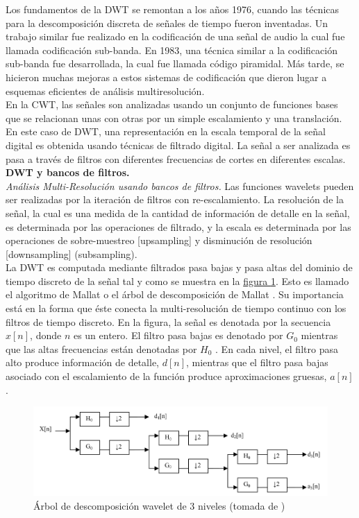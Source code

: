 \documentclass[11pt,lettersize]{article} %
\newcommand{\figura}[1]{\hyperref[{#1}]{figura \ref*{#1}}}
\begin{document}
Los fundamentos de la DWT se remontan a los años 1976, cuando las técnicas para la descomposición discreta de señales de tiempo fueron inventadas. Un trabajo similar fue realizado en la codificación de una señal de audio la cual fue llamada codificación sub-banda. En 1983, una técnica similar a la codificación sub-banda fue desarrollada, la cual fue llamada código piramidal. Más tarde, se hicieron muchas mejoras a estos sistemas de codificación que dieron lugar a esquemas eficientes de análisis multiresolución.\\

En la CWT, las señales son analizadas usando un conjunto de funciones bases que se relacionan unas con otras por un simple escalamiento y una translación. En este caso de DWT, una representación en la escala temporal de la señal digital es obtenida usando técnicas de filtrado digital. La señal a ser analizada es pasa a través de filtros con diferentes frecuencias de cortes en diferentes escalas.\\

\textbf{DWT y bancos de filtros.}\\
\textit{Análisis Multi-Resolución usando bancos de filtros.}
Las funciones wavelets pueden ser realizadas por la iteración de filtros con re-escalamiento. La resolución de la señal, la cual es una medida de la cantidad de información de detalle en la señal, es determinada por las operaciones de filtrado, y la escala es determinada por las operaciones de sobre-muestreo [upsampling] y disminución de resolución [downsampling] (subsampling).\\

La DWT es computada mediante filtrados pasa bajas y pasa altas del dominio de tiempo discreto de la señal tal y como se muestra en la \figura{F-desc-3}. Esto es llamado el algoritmo de Mallat o el árbol de descomposición de Mallat \cite{Sripathi2003}. Su importancia está en la forma que éste conecta la multi-resolución de tiempo continuo con los filtros de tiempo discreto. En la figura, la señal es denotada por la secuencia $x[n]$, donde $n$ es un entero. El filtro pasa bajas es denotado por $G_0$ mientras que las altas frecuencias están denotadas por $H_0$ . En cada nivel, el filtro pasa alto produce información de detalle, $d[n]$, mientras que el filtro pasa bajas asociado con el escalamiento de la función produce
aproximaciones gruesas, $a[n]$.
\begin{figure}[h!]
	\centering
	\includegraphics[width=.9\textwidth]{images/desc-3.png}
	\caption[Árbol de descomposición wavelet de 3 niveles]{Árbol de descomposición wavelet de 3 niveles (tomada de \cite{Sripathi2003})}
	\label{F-desc-3}
\end{figure}
\end{document}
